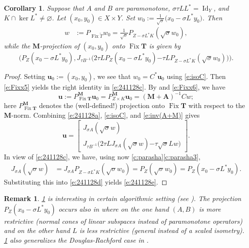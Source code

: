 \documentclass{article}
\newcommand{\bM}{\ensuremath{{\mathbf{M}}}}
\newcommand{\bu}{\ensuremath{\mathbf{u}}}
\newcommand{\Tt}{\ensuremath{\widetilde{T}}}
\newcommand{\Fix}{\ensuremath{\operatorname{Fix}}}
\newcommand{\Id}{\ensuremath{\operatorname{Id}}}
\newcommand{\bT}{\ensuremath{{\mathbf{T}}}}
\newcommand{\bA}{\ensuremath{{\mathbf{A}}}}
\newtheorem{corollary}[theorem]{Corollary}
\newtheorem{remark}[theorem]{Remark}
\begin{document}
\begin{corollary}
\label{c:Gukeshwon}
Suppose that $A$ and $B$ are paramonotone, 
$\sigma\tau LL^* = \Id_Y$, and 
$K\cap\ker L^*\neq\varnothing$. 
Let $(x_0,y_0)\in X\times Y$.
Set 
$w_0 := \tfrac{1}{\sqrt{\sigma}}\big(x_0-\sigma L^*y_0\big)$.
Then 
\begin{align}
\label{e:241128c}
w &:= P_{\Fix \Tt}w_0 = 
\tfrac{1}{\sqrt{\sigma}} P_{Z-\sigma L^*K}(\sqrt{\sigma}w_0), 
\end{align}
while the $\bM$-projection of $(x_0,y_0)$ onto $\Fix\bT$ is given by 
\begin{equation}
\label{e:241128e}
\Big(P_Z(x_0-\sigma L^*y_0),J_{\tau B^{-1}}\big(2\tau L P_Z(x_0-\sigma L^*y_0)
{
-\tau LP_{Z-\sigma L^*K}(\sqrt{\sigma}w_0)
}
\big)\Big).
\end{equation}
\end{corollary}
\begin{proof}
Setting $\bu_0 := (x_0,y_0)$,
we see that $w_0 = C^*\bu_0$ using \cref{e:isoC}.
Then \cref{e:Fixx5} yields the right identity in \cref{e:241128c}. 
By \cite[Theorem~3.1(i)]{BMSW} and \cref{e:Fixx6}, we have 
\begin{equation}
\label{e:241128a}
\bu := P^{\bM}_{\Fix \bT}\bu_0=P^{\bM}_{Z\times K}\bu_0 = (\bM+\bA)^{-1}Cw; 
\end{equation}
here $P^{\bM}_{\Fix\bT}$ denotes the (well-defined!) 
projection onto $\Fix\bT$ with respect to  the $\bM$-norm. 
Combining \cref{e:241128a}, \cref{e:isoC}, and 
\cref{e:inv(A+M)} gives
\begin{equation}
\label{e:241128d}
\bu 
=
\begin{bmatrix}
J_{\sigma A}(\sqrt{\sigma}w)\\
J_{\tau B^{-1}}\big(2\tau LJ_{\sigma A}(\sqrt{\sigma}w)
{ -
\tau\sqrt{\sigma}Lw
}
\big)
\end{bmatrix}.
\end{equation}
In view of \cref{e:241128c}, we have, 
using now \cref{c:parasha}\cref{c:parasha3}, 
\begin{align}
J_{\sigma A}(\sqrt{\sigma}w)
&=
J_{\sigma A}P_{Z-\sigma L^*K}(\sqrt{\sigma} w_0)
=P_Z(\sqrt{\sigma} w_0)
=P_Z(x_0-\sigma L^*y_0). 
\end{align}
Substituting this into 
\cref{e:241128d} yields \cref{e:241128e}.
\end{proof}

\begin{remark}
\cref{c:Gukeshwon} is interesting in certain algorithmic setting 
(see \cite[Section~5]{BMSW}). The 
projection $P_Z(x_0-\sigma L^*
{
y_0
}
)$ occurs also in 
\cite[Lemma~5.1]{BMSW} where on the one hand $(A,B)$ is more restrictive 
(normal cones of linear subspaces instead of paramonotone operators)
and on the other hand $L$ is less restrictive (general instead of a scaled isometry).
\cref{c:Gukeshwon} also generalizes the Douglas-Rachford case 
in \cite[Section~5.1.2]{BMSW}. 
\end{remark}
\end{document}
